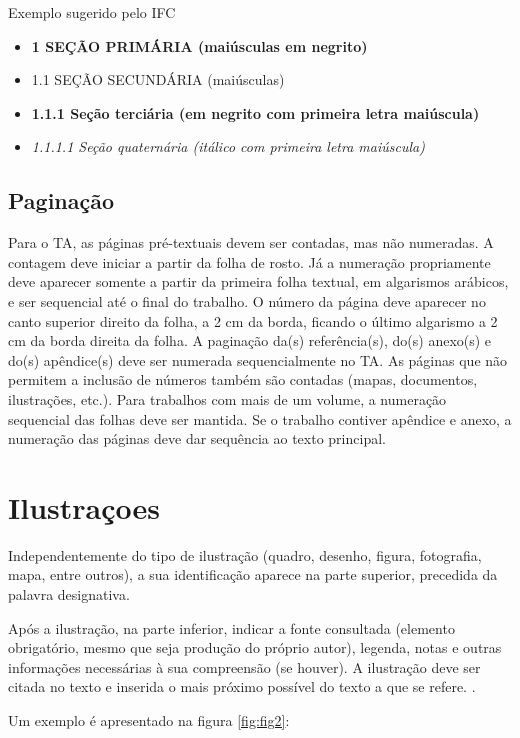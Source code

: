 Exemplo sugerido pelo IFC
\begin{itemize}
\item[] \textbf{1  SEÇÃO PRIMÁRIA (maiúsculas em negrito)}
\item[] 1.1  SEÇÃO SECUNDÁRIA (maiúsculas)
\item[] \textbf{1.1.1   Seção terciária (em negrito com primeira letra maiúscula)}
\item[] \textit{1.1.1.1 Seção quaternária (itálico com primeira letra maiúscula)}
\end{itemize}


\subsection{\textbf{Paginação}}
Para o TA, as páginas pré-textuais devem ser contadas, mas não numeradas. A contagem deve iniciar a partir da folha de rosto. Já a numeração propriamente deve aparecer somente a partir da primeira folha textual, em algarismos arábicos, e ser sequencial até o final do trabalho. 
O número da página deve aparecer no canto superior direito da folha, a 2 cm da borda, ficando o último algarismo a 2 cm da borda direita da folha.
A paginação da(s) referência(s), do(s) anexo(s) e do(s) apêndice(s) deve ser numerada sequencialmente no TA. As páginas que não permitem a inclusão de números também são contadas (mapas, documentos, ilustrações, etc.).
Para trabalhos com mais de um volume, a numeração sequencial das folhas deve ser mantida. Se o trabalho contiver apêndice e anexo, a numeração das páginas deve dar sequência ao texto principal.

\section{Ilustraçoes}
Independentemente do tipo de ilustração (quadro, desenho, figura, fotografia, mapa, entre outros), a sua identificação aparece na parte superior, precedida da palavra designativa. 
\begin{citacao}
Após a ilustração, na parte inferior, indicar a fonte consultada (elemento obrigatório, mesmo que seja produção do próprio autor), legenda, notas e outras informações necessárias à sua compreensão (se houver). A ilustração deve ser citada no texto e inserida o mais próximo possível do texto a que se refere. \cite[p. 11]{abnt14724}.
\end{citacao}

Um exemplo é apresentado na figura \ref{fig:fig2}:


